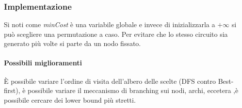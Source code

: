 \subsubsection{Implementazione}

Si noti come \emph{minCost} \`e una variabile globale e invece di inizializzarla a $+\infty$ si pu\`o scegliere una permutazione a caso. Per evitare che lo stesso circuito sia generato 
pi\`u volte si parte da un nodo fissato. 
\paragraph{Possibili miglioramenti}
\`E possibile variare l'ordine di visita dell'albero delle scelte (DFS contro Best-first), \`e possibile variare il meccanismo di branching sui nodi, archi, eccetera ,\`e possibile 
cercare dei lower bound pi\`u stretti. 
